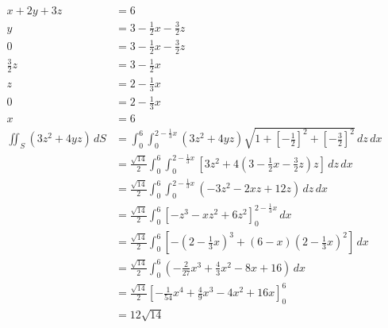 \documentclass{article}
\begin{document}
\begin{align*}
  x + 2 y + 3 z                & = 6                                                                                                                                             \\
  y                            & = 3 - \frac{1}{2} x - \frac{3}{2} z                                                                                                             \\
  0                            & = 3 - \frac{1}{2} x - \frac{3}{2} z                                                                                                             \\
  \frac{3}{2} z                & = 3 - \frac{1}{2} x                                                                                                                             \\
  z                            & = 2 - \frac{1}{3} x                                                                                                                             \\
  0                            & = 2 - \frac{1}{3} x                                                                                                                             \\
  x                            & = 6                                                                                                                                             \\
  \iint_S (3 z^2 + 4 y z) \,dS & = \int_0^6 \int_0^{2 - \frac{1}{3} x} (3 z^2 + 4 y z) \sqrt{1 + \left[ -\frac{1}{2} \right]^2 + \left[ -\frac{3}{2} \right]^2} \,dz \,dx        \\
                               & = \frac{\sqrt{14}}{2} \int_0^6 \int_0^{2 - \frac{1}{3} x} \left[ 3 z^2 + 4 \left( 3 - \frac{1}{2} x - \frac{3}{2} z \right) z \right] \,dz \,dx \\
                               & = \frac{\sqrt{14}}{2} \int_0^6 \int_0^{2 - \frac{1}{3} x} \left( -3 z^2 - 2 x z + 12 z \right) \,dz \,dx                                        \\
                               & = \frac{\sqrt{14}}{2} \int_0^6 [-z^3 - x z^2 + 6 z^2]_0^{2 - \frac{1}{3} x} \,dx                                                                \\
                               & = \frac{\sqrt{14}}{2} \int_0^6 \left[ -\left( 2 - \frac{1}{3} x \right)^3 + (6 - x) \left( 2 - \frac{1}{3} x \right)^2 \right] \,dx             \\
                               & = \frac{\sqrt{14}}{2} \int_0^6 \left( -\frac{2}{27} x^3 + \frac{4}{3} x^2 - 8 x + 16 \right) \,dx                                               \\
                               & = \frac{\sqrt{14}}{2} \left[ -\frac{1}{54} x^4 + \frac{4}{9} x^3 - 4 x^2 + 16 x \right]_0^6                                                     \\
                               & = 12 \sqrt{14}
\end{align*}
\end{document}
